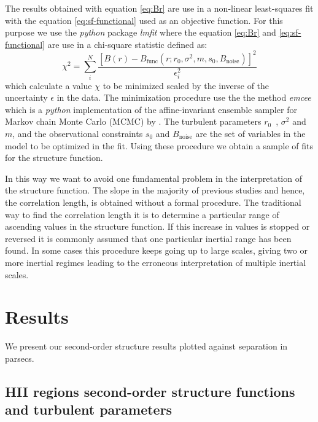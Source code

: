 \documentclass[fleqn,usenatbib, useAMS, a4paper]{mnras}
\begin{document}
The results obtained with equation \ref{eq:Br} are use in a non-linear least-squares fit with the equation \ref{eq:sf-functional} used as an objective function.
For this purpose we use the \textit{python} package \textit{lmfit} \citep{newville_matthew_2014_11813} where the equation \ref{eq:Br} and \ref{eq:sf-functional} are use in a chi-square statistic defined as:
%
%
%
\begin{equation}\label{eq:chi}
  \chi^2 = \sum_i ^N \frac{[B(r)-B_{\text{func}}(r;r_0, \sigma^2, m, s_0, B_{\text{noise}})]^2}{\epsilon_i ^2}
\end{equation}
%
which calculate a value \(\chi\) to be minimized scaled by the inverse of the uncertainty \(\epsilon\) in the data.
The minimization procedure use the the method \textit{emcee} \citep{2013PASP..125..306F} which is a \textit{python} implementation of the affine-invariant ensemble sampler for Markov chain Monte Carlo (MCMC) by \citet{2010CAMCS...5...65G}.  
The turbulent parameters \(r_{0}\)\ , \(\sigma^2\) and \(m\), and the observational constraints \(s_0\) and \( B_{\text{noise}}\) are the set of variables in the model to be optimized in the fit.
Using these procedure we obtain a sample of fits for the structure function.

In this way we want to avoid one fundamental problem in the interpretation of the structure function. 
The slope in the majority of previous studies and hence, the correlation length, is obtained without a formal procedure. 
The traditional way to find the correlation length it is to determine a particular range of ascending values in the structure function. 
If this increase in values is stopped or reversed it is commonly assumed that one particular inertial range has been found. 
In some cases this procedure keeps going up to large scales, giving two or more inertial regimes leading to the erroneous interpretation of multiple inertial scales.

\section{Results}\label{sec:results}

We present our second-order structure results plotted against separation in parsecs.

\subsection{HII regions second-order structure functions and turbulent parameters}
\end{document}
